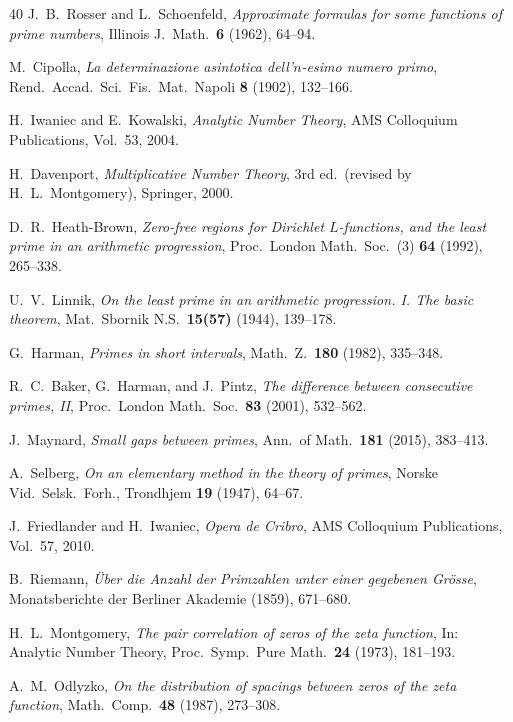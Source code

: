 \documentclass[11pt,a4paper]{article}
\theoremstyle{plain}
\theoremstyle{definition}
\begin{document}
\begin{thebibliography}{40}
 J.~B.~Rosser and L.~Schoenfeld, \textit{Approximate formulas
for some functions of prime numbers}, Illinois J.\ Math.\ \textbf{6} (1962),
64--94.

 M.~Cipolla, \textit{La determinazione asintotica dell'$n$-esimo
numero primo}, Rend.\ Accad.\ Sci.\ Fis.\ Mat.\ Napoli \textbf{8} (1902), 132--166.

 H.~Iwaniec and E.~Kowalski, \textit{Analytic Number Theory},
AMS Colloquium Publications, Vol.~53, 2004.

 H.~Davenport, \textit{Multiplicative Number Theory}, 3rd ed.\
(revised by H.~L.~Montgomery), Springer, 2000.

 D.~R.~Heath-Brown, \textit{Zero-free regions for Dirichlet
$L$-functions, and the least prime in an arithmetic progression}, Proc.\ London
Math.\ Soc.\ (3) \textbf{64} (1992), 265--338.

 U.~V.~Linnik, \textit{On the least prime in an arithmetic
progression. I. The basic theorem}, Mat.\ Sbornik N.S.\ \textbf{15(57)} (1944),
139--178.

 G.~Harman, \textit{Primes in short intervals}, Math.\ Z.\
\textbf{180} (1982), 335--348.

 R.~C.~Baker, G.~Harman, and J.~Pintz, \textit{The difference
between consecutive primes, II}, Proc.\ London Math.\ Soc.\ \textbf{83} (2001),
532--562.

 J.~Maynard, \textit{Small gaps between primes}, Ann.\ of
Math.\ \textbf{181} (2015), 383--413.

 A.~Selberg, \textit{On an elementary method in the theory of
primes}, Norske Vid.\ Selsk.\ Forh., Trondhjem \textbf{19} (1947), 64--67.

\bibitem{friedlander} J.~Friedlander and H.~Iwaniec, \textit{Opera de Cribro},
AMS Colloquium Publications, Vol.~57, 2010.

 B.~Riemann, \textit{\"Uber die Anzahl der Primzahlen unter
einer gegebenen Gr\"osse}, Monatsberichte der Berliner Akademie (1859), 671--680.

\bibitem{montgomery} H.~L.~Montgomery, \textit{The pair correlation of zeros of
the zeta function}, In: Analytic Number Theory, Proc.\ Symp.\ Pure Math.\
\textbf{24} (1973), 181--193.

\bibitem{odlyzko} A.~M.~Odlyzko, \textit{On the distribution of spacings between
zeros of the zeta function}, Math.\ Comp.\ \textbf{48} (1987), 273--308.


\end{thebibliography}
\end{document}
